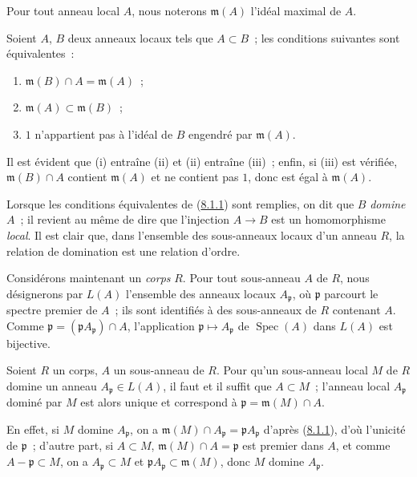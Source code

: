 Pour tout anneau local $A$, nous noterons $\mathfrak m(A)$ l'idéal maximal de
$A$.

\begin{lemma}[8.1.1]
\label{I.8.1.1-fr}
Soient $A$, $B$ deux anneaux locaux tels que $A\subset B$~; les conditions
suivantes sont équivalentes~:
\begin{enumerate}
  \item[(i)] $\mathfrak m(B)\cap A=\mathfrak m(A)$~;
  \item[(ii)] $\mathfrak m(A)\subset\mathfrak m(B)$~;
  \item[(iii)] $1$ n'appartient pas à l'idéal de $B$ engendré par
    $\mathfrak m(A)$.
\end{enumerate}
\end{lemma}

Il est évident que (i) entraîne (ii) et (ii) entraîne (iii)~; enfin, si (iii)
est vérifiée, $\mathfrak m(B)\cap A$ contient $\mathfrak m(A)$ et ne contient
pas $1$, donc est égal à $\mathfrak m(A)$.

Lorsque les conditions équivalentes de
(\hyperref[I.8.1.1-fr]{8.1.1}) sont remplies, on dit que $B$ \emph{domine}
$A$~; il revient au même de dire que l'injection $A\to B$ est un
homomorphisme \emph{local}. Il est clair que, dans l'ensemble des sous-anneaux
locaux d'un anneau $R$, la relation de domination est une relation d'ordre.

\begin{env}[8.1.2]
\label{I.8.1.2-fr}
Considérons maintenant un \emph{corps} $R$. Pour tout sous-anneau $A$ de $R$,
nous désignerons par $L(A)$ l'ensemble des anneaux locaux $A_\mathfrak p$, où
$\mathfrak p$ parcourt le spectre premier de $A$~; ils sont identifiés à des
sous-anneaux de $R$ contenant $A$. Comme
$\mathfrak p=(\mathfrak p A_\mathfrak p)\cap A$, l'application
$\mathfrak p\mapsto A_\mathfrak p$ de $\operatorname{Spec}(A)$ dans $L(A)$
est bijective.
\end{env}

\begin{lemma}[8.1.3]
\label{I.8.1.3-fr}
Soient $R$ un corps, $A$ un sous-anneau de $R$. Pour qu'un sous-anneau local
$M$ de $R$ domine un anneau $A_\mathfrak p\in L(A)$, il faut et il suffit que
$A\subset M$~; l'anneau local $A_\mathfrak p$ dominé par $M$ est alors unique
et correspond à $\mathfrak p=\mathfrak m(M)\cap A$.
\end{lemma}

En effet, si $M$ domine $A_\mathfrak p$, on a
$\mathfrak m(M)\cap A_\mathfrak p=\mathfrak p A_\mathfrak p$ d'après
(\hyperref[I.8.1.1-fr]{8.1.1}), d'où l'unicité de $\mathfrak p$~; d'autre
part, si $A\subset M$, $\mathfrak m(M)\cap A=\mathfrak p$ est premier dans
$A$, et comme $A-\mathfrak p\subset M$, on a $A_\mathfrak p\subset M$ et
$\mathfrak p A_\mathfrak p\subset\mathfrak m(M)$, donc $M$ domine
$A_\mathfrak p$.

